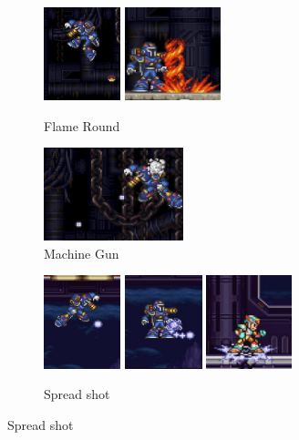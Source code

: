 \begin{figure}[htp]
	\centering
	\begin{subfigure}{.45\linewidth}
		\centering
		\includegraphics[height=2.7cm]{figures/X3/Doppler_stages/vile_bomb_1.jpg}
		\includegraphics[height=2.7cm]{figures/X3/Doppler_stages/vile_bomb_2.jpg}
		\caption{Flame Round}
	\end{subfigure}
	\begin{subfigure}{.4\linewidth}
		\centering
		\includegraphics[height=2.7cm]{figures/X3/Doppler_stages/vile_gatling.jpg}
		\caption{Machine Gun}
	\end{subfigure}
	\begin{subfigure}{\linewidth}
		\centering
		\includegraphics[height=2.7cm]{figures/X3/Doppler_stages/vile_par_1.jpg}
		\includegraphics[height=2.7cm]{figures/X3/Doppler_stages/vile_par_11.jpg}
		\includegraphics[height=2.7cm]{figures/X3/Doppler_stages/vile_par_2.jpg}
		\caption{Spread shot}
	\end{subfigure}
\end{figure}

